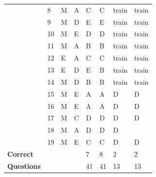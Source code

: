 \documentclass[pageno]{final_paper}
\begin{document}
\begin{table}[b]
\begin{tabularx}{\textwidth}{lXXXXXXX}
\textbf{}                & 8          & M & A     & C                       & C                      & train                   & train                       \\
\textbf{}                & 9          & M & D     & E                       & E                      & train                   & train                       \\
\textbf{}                & 10         & M & E     & D                       & D                      & train                   & train                       \\
\textbf{}                & 11         & M & A     & B                       & B                      & train                   & train                       \\
\textbf{}                & 12         & E & A     & C                       & C                      & train                   & train                       \\
\textbf{}                & 13         & E & D     & E                       & B                      & train                   & train                       \\
\textbf{}                & 14         & M & D     & B                       & B                      & train                   & train                       \\
\textbf{}                & 15         & M & E     & A                       & A                      & D                       & D                           \\
\textbf{}                & 16         & M & E     & A                       & A                      & D                       & D                           \\
\textbf{}                & 17         & M & C     & D                       & D                      & D                       & D                           \\
\textbf{}                & 18         & M & A     & D                       & D                      & D                       & \g{A}                           \\
\textbf{}                & 19         & M & E     & C                       & C                      & D                       & D                           \\ \midrule
\textbf{Correct}         &            &   &       & 7                       & 8                      & 2                       & 2                           \\
\textbf{Questions}       &            &   &       & 41                      & 41                     & 13                      & 13                          \\ \bottomrule
\end{tabularx}
\end{table}
\end{document}
